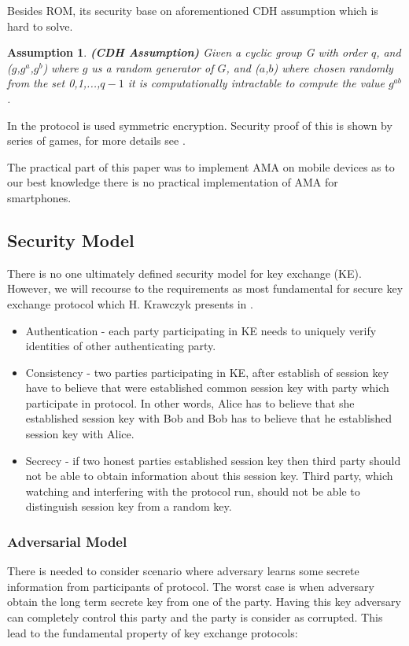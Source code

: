 \documentclass[11pt,titlepage]{article}
\theoremstyle{plain}
\newtheorem{assumption}{Assumption}
\begin{document}
\vspace{5mm}

Besides ROM, its security base on aforementioned CDH assumption which is hard to solve.
\begin{assumption}
	\textbf{(CDH Assumption)} 
	Given a cyclic group G with order $q$, and ($g$,$g^a$,$g^b$) where $g$ us a random generator of $G$, and ($a$,$b$) where chosen randomly from the set {0,1,...,$q-1$} it is computationally intractable to compute the value $g^{ab}$.
\end{assumption}
 In the protocol is used symmetric encryption. Security proof of this is shown by series of games, for more details see \cite{AMA}. 

\vspace{5mm}

The practical part of this paper was to implement AMA on mobile devices as to our best knowledge there is no practical implementation of AMA for smartphones.



\subsection{Security Model}
There is no one ultimately defined security model for key exchange (KE). However, we will recourse to the requirements as most fundamental for secure key exchange protocol which H. Krawczyk presents in \cite{sign_mac}.

\begin{itemize}
	\item Authentication - each party participating in KE needs to uniquely verify identities of other authenticating party.
	\item Consistency - two parties participating in KE, after establish of session key have to believe that were established common session key with party which participate in protocol. In other words, Alice has to believe that she established session key with Bob and Bob has to believe that he established session key with Alice.
	\item Secrecy - if two honest parties established session key then third party should not be able to obtain information about this session key. Third party, which watching and interfering with the protocol run, should not be able to distinguish session key from a random key.
\end{itemize}

\subsubsection{Adversarial Model}
There is needed to consider scenario where adversary learns some secrete information from participants of protocol. The worst case is when adversary obtain the long term secrete key from one of the party. Having this key adversary can completely control this party and the party is consider as corrupted. This lead to the fundamental property of key exchange protocols:
\end{document}
